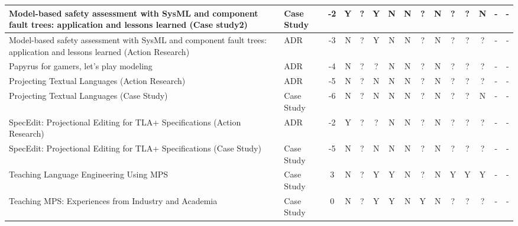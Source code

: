 \begin{landscape}
\begin{longtable}{ | p{11cm} | l | *{13}{c|} }
        Model-based safety assessment with SysML and component fault trees: application and lessons learned (Case study2)\cite{munk2020model_SLR}                              & Case Study        &  -2   & Y & ? & Y & N & N & ? & N & ? & ? & N  & - & - \\\hline
        Model-based safety assessment with SysML and component fault trees: application and lessons learned (Action Research)\cite{munk2020model_SLR}                          & ADR               &  -3   & N & ? & Y & N & N & ? & N & ? & ? & ?  & - & - \\\hline
        Papyrus for gamers, let’s play modeling\cite{bucchiarone2020papyrus_SLR}                                                                                               & ADR               &  -4   & N & ? & ? & N & N & ? & N & ? & ? & ?  & - & - \\\hline
        Projecting Textual Languages (Action Research)\cite{merino2021projecting_SLR}                                                                                          & ADR               &  -5   & N & ? & N & N & N & ? & N & ? & ? & ?  & - & - \\\hline
        Projecting Textual Languages (Case Study)\cite{merino2021projecting_SLR}                                                                                               & Case Study        &  -6   & N & ? & N & N & N & ? & N & ? & ? & N  & - & - \\\hline
        SpecEdit: Projectional Editing for TLA+ Specifications (Action Research)\cite{cuinat2020specedit_SLR}                                                                  & ADR               &  -2   & Y & ? & ? & N & N & ? & N & ? & ? & ?  & - & - \\\hline
        SpecEdit: Projectional Editing for TLA+ Specifications (Case Study)\cite{cuinat2020specedit_SLR}                                                                       & Case Study        &  -5   & N & ? & N & N & N & ? & N & ? & ? & ?  & - & - \\\hline
        Teaching Language Engineering Using MPS\cite{prinz2021teaching_SLR}                                                                                                    & Case Study        &  3    & N & ? & Y & Y & N & ? & N & Y & Y & Y  & - & - \\\hline
        Teaching MPS: Experiences from Industry and Academia\cite{barash2021teaching_SLR}                                                                                      & Case Study        &  0    & N & ? & Y & Y & N & Y & N & ? & ? & ?  & - & - \\\hline

\end{longtable}
\end{landscape}
